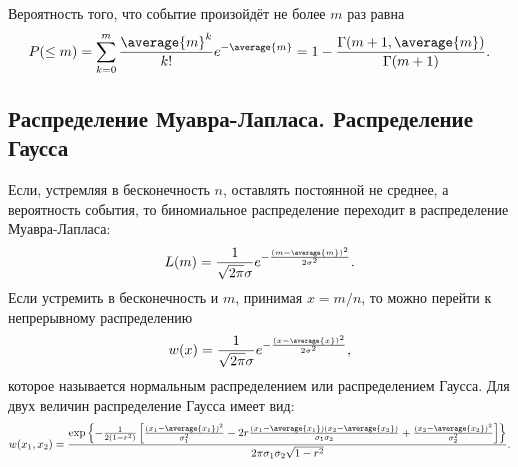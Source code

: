     Вероятность того, что событие произойдёт не более \( m \) раз равна
    \[
        P(\le m) = \sum_{k=0}^m \frac{\average{m}^k}{k!}e^{-\average{m}} =
        1 - \frac{\Gamma(m+1, \average{m})}{\Gamma(m+1)}.
    \]

\subsection{Распределение Муавра-Лапласа. Распределение Гаусса}
    Если, устремляя в бесконечность \( n \), оставлять постоянной не среднее, а
    вероятность события, то биномиальное распределение переходит в распределение
    Муавра-Лапласа:
    \[
        L(m) = \frac{1}{\sqrt{2\pi}\sigma}
            e^{-\frac{\left(m-\average{m}\right)^2}{2\sigma^2}}.
    \]
    Если устремить в бесконечность и \( m \), принимая \( x = m / n \), то можно
    перейти к непрерывному распределению
    \[
        w(x) = \frac{1}{\sqrt{2\pi}\sigma}
            e^{-\frac{\left(x-\average{x}\right)^2}{2\sigma^2}},
    \]
    которое называется нормальным распределением или распределением Гаусса.
    Для двух величин распределение Гаусса имеет вид:
    \[
        w(x_1, x_2) = \frac{
            \exp\left\{-\frac{1}{2(1-r^2)}\left[
                \frac{(x_1 - \average{x_1})^2}{\sigma_1^2} -
                2r\frac{(x_1 - \average{x_1})(x_2 - \average{x_2})}
                    {\sigma_1\sigma_2} +
                \frac{(x_2 - \average{x_2})^2}{\sigma_2^2}
            \right]\right\}
            }{2\pi\sigma_1\sigma_2\sqrt{1 - r^2}}.
    \]

